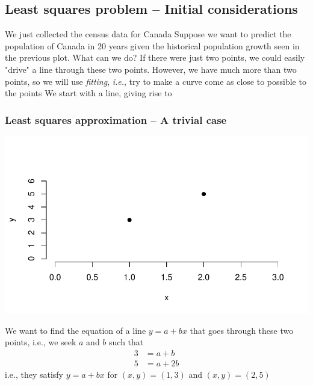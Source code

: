 \documentclass[aspectratio=169]{beamer}\usepackage[]{graphicx}\usepackage[]{xcolor}
\makeatletter
\def\maxwidth{ %
  \ifdim\Gin@nat@width>\linewidth
    \linewidth
  \else
    \Gin@nat@width
  \fi
}
\newenvironment{knitrout}{}{} %
\makeatother
\begin{document}
\subsection{Least squares problem -- Initial considerations}

\begin{frame}
We just collected the census data for Canada
\vfill
Suppose we want to predict the population of Canada in 20 years given the historical population growth seen in the previous plot. What can we do?
\vfill
If there were just two points, we could easily "drive" a line through these two points. However, we have much more than two points, so we will use \emph{fitting}, \emph{i.e.}, try to make a curve come as close to possible to the points
\vfill
We start with a line, giving rise to 
\end{frame}

\begin{frame}[fragile]\frametitle{Least squares approximation -- A trivial case}
\begin{knitrout}
\color{fgcolor}
\includegraphics[width=\maxwidth]{FIGS/matrix-methods-plot-2-points-and-line-1} 
\end{knitrout}
\end{frame}

\begin{frame}
We want to find the equation of a line $y=a+bx$ that goes through these two points, i.e., we seek $a$ and $b$ such that
$$
\begin{aligned}
3 &= a+b \\
5 &= a+2b
\end{aligned}
$$
i.e., they satisfy $y=a+bx$ for $(x,y)=(1,3)$ and $(x,y)=(2,5)$
\end{frame}
\end{document}

